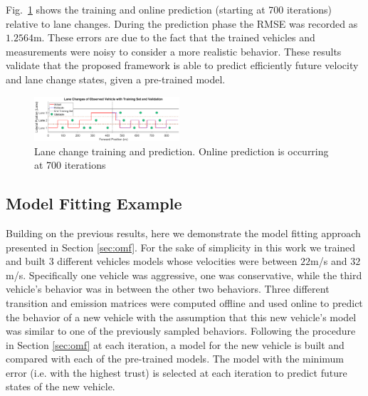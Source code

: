 \documentclass[letterpaper, 10 pt, conference]{ieeeconf}  %
\begin{document}
Fig.~\ref{fig:train2} shows the training and online prediction (starting at 700 iterations) relative to lane changes. During the prediction phase the RMSE was recorded as $1.2564$m. These errors are due to the fact that the trained vehicles and measurements were noisy to consider a more realistic behavior. These results validate that the proposed framework is able to predict efficiently future velocity and lane change states, given a pre-trained model.

\begin{figure}[ht]
\includegraphics[width=0.48\textwidth]{fig/train2.png}
\caption{Lane change training and prediction. Online prediction is occurring at 700 iterations} \label{fig:train2}
\end{figure}

\subsection{Model Fitting Example}

Building on the previous results, here we demonstrate the model fitting approach presented in Section \ref{sec:omf}. For the sake of simplicity in this work we trained and built 3 different vehicles models whose velocities were between $22$m/s and $32$m/s. Specifically one vehicle was aggressive, one was conservative, while the third vehicle's behavior was in between the other two behaviors. Three different transition and emission matrices were computed offline and used online to predict the behavior of a new vehicle with the assumption that this new vehicle's model was similar to one of the previously sampled behaviors. Following the procedure in Section \ref{sec:omf} at each iteration, a model for the new vehicle is built and compared with each of the pre-trained models. The model with the minimum error (i.e. with the highest trust) is selected at each iteration to predict future states of the new vehicle.
\end{document}

